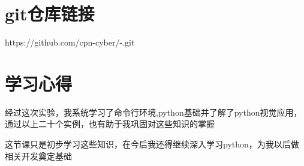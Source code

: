 \documentclass[a4paper, 12pt]{article}
\begin{document}
        \section{git仓库链接}
        https://github.com/cpn-cyber/-.git
        \section{学习心得}
        经过这次实验，我系统学习了命令行环境,python基础并了解了python视觉应用，通过以上二十个实例，也有助于我巩固对这些知识的掌握

        \par
        这节课只是初步学习这些知识，在今后我还得继续深入学习python，为我以后做相关开发奠定基础
      
\end{document}
